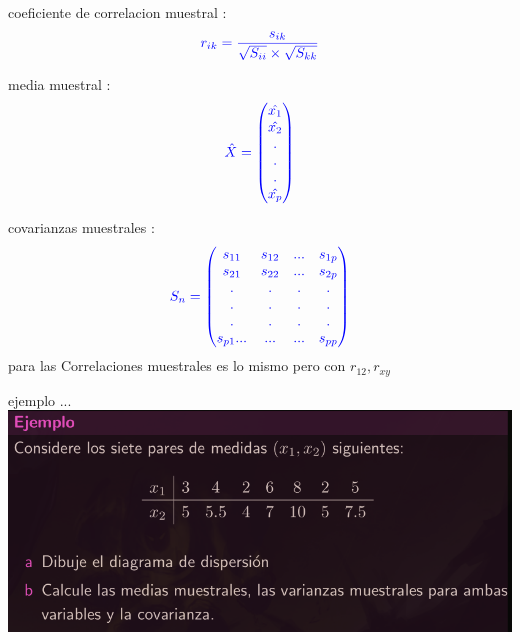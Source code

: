 \documentclass[10pt,a4paper]{article} %
\begin{document}
        coeficiente de correlacion muestral :
        \begin{equation}
            \color{blue}  r_{ik} = \frac{s_{ik}}{\sqrt{S_{ii}}\times
            \sqrt{S_{kk}}  } \color{white}
        \end{equation}


        media muestral :
        \begin{equation}
            \color{blue} \hat{X} =  \begin{pmatrix}
                \hat{x_1}
                \\ \hat{x_2}
                \\ .
                \\ .
                \\ .
                \\ \hat{x_p}
            \end{pmatrix}
             \color{white}
        \end{equation}

        covarianzas muestrales :
        \begin{equation}
            \color{blue} S_n = \begin{pmatrix}
                s_{11}  & s_{12} & ... & s_{1p}
                \\ s_{21} & s_{22} & ... & s_{2p}
                \\ . & . & . & .
                \\ . & . & . & .
                \\ . & . & . & .
                \\ s_{p1} ... & ... &  ... &s_{pp}
            \end{pmatrix}
             \color{white}
        \end{equation}
        \color{red} para las Correlaciones muestrales es lo mismo pero con $
        r_{12} , r_{xy}  $  \color{white}

        ejemplo ...
        \includegraphics[width=0.8\linewidth]{ejemplo.png}
\end{document}
